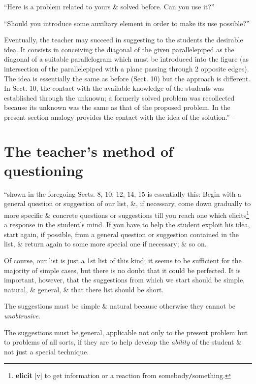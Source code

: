 \documentclass[oneside]{book}
\numberwithin{equation}{section}
\begin{document}
``Here is a problem related to yours \& solved before. Can you use it?''

``Should you introduce some auxiliary element in order to make its use possible?''

Eventually, the teacher may succeed in suggesting to the students the desirable idea. It consists in conceiving the diagonal of the given parallelepiped as the diagonal of a suitable parallelogram which must be introduced into the figure (as intersection of the parallelepiped with a plane passing through 2 opposite edges). The idea is essentially the same as before (Sect. 10) but the approach is different. In Sect. 10, the contact with the available knowledge of the students was established through the unknown; a formerly solved problem was recollected because its unknown was the same as that of the proposed problem. In the present section analogy provides the contact with the idea of the solution.'' -- \cite[pp. 19--20]{Polya2014}

\section{The teacher's method of questioning}
``shown in the foregoing Sects. 8, 10, 12, 14, 15 is essentially this: Begin with a general question or suggestion of our list, \&, if necessary, come down gradually to more specific \& concrete questions or suggestions till you reach one which elicits\footnote{\textbf{elicit} [v] to get information or a reaction from somebody\texttt{/}something.} a response in the student's mind. If you have to help the student exploit his idea, start again, if possible, from a general question or suggestion contained in the list, \& return again to some more special one if necessary; \& so on.

Of course, our list is just a 1st list of this kind; it seems to be sufficient for the majority of simple cases, but there is no doubt that it could be perfected. It is important, however, that the suggestions from which we start should be simple, natural, \& general, \& that there list should be short.

The suggestions must be simple \& natural because otherwise they cannot be \textit{unobtrusive}.

The suggestions must be general, applicable not only to the present problem but to problems of all sorts, if they are to help develop the \textit{ability} of the student \& not just a special technique.
\end{document}
